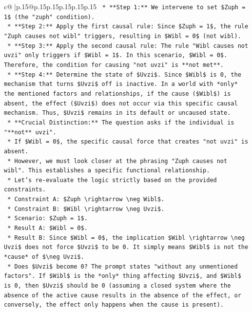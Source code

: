 \documentclass{article}
\begin{document}
{\begin{supertabular}{c@{$\;$}|p{.15\linewidth}@{}p{.15\linewidth}p{.15\linewidth}p{.15\linewidth}p{.15\linewidth}p{.15\linewidth}}
{{{\texttt{    *   **Step 1:** We intervene to set \$Zuph = 1\$ (the "zuph" condition).} \\
\texttt{    *   **Step 2:** Apply the first causal rule: Since \$Zuph = 1\$, the rule "Zuph causes not wibl" triggers, resulting in \$Wibl = 0\$ (not wibl).} \\
\texttt{    *   **Step 3:** Apply the second causal rule: The rule "Wibl causes not uvzi" only triggers if \$Wibl = 1\$. In this scenario, \$Wibl = 0\$. Therefore, the condition for causing "not uvzi" is **not met**.} \\
\texttt{    *   **Step 4:** Determine the state of \$Uvzi\$. Since \$Wibl\$ is 0, the mechanism that turns \$Uvzi\$ off is inactive. In a world with *only* the mentioned factors and relationships, if the cause (\$Wibl\$) is absent, the effect (\$Uvzi\$) does not occur via this specific causal mechanism. Thus, \$Uvzi\$ remains in its default or uncaused state.} \\
\texttt{    *   **Crucial Distinction:** The question asks if the individual is "**not** uvzi".} \\
\texttt{        *   If \$Wibl = 0\$, the specific causal force that creates "not uvzi" is absent.} \\
\texttt{        *   However, we must look closer at the phrasing "Zuph causes not wibl". This establishes a specific functional relationship.} \\
\texttt{        *   Let's re{-}evaluate the logic strictly based on the provided constraints.} \\
\texttt{        *   Constraint A: \$Zuph \textbackslash{}rightarrow \textbackslash{}neg Wibl\$.} \\
\texttt{        *   Constraint B: \$Wibl \textbackslash{}rightarrow \textbackslash{}neg Uvzi\$.} \\
\texttt{        *   Scenario: \$Zuph = 1\$.} \\
\texttt{        *   Result A: \$Wibl = 0\$.} \\
\texttt{        *   Result B: Since \$Wibl = 0\$, the implication \$Wibl \textbackslash{}rightarrow \textbackslash{}neg Uvzi\$ does not force \$Uvzi\$ to be 0. It simply means \$Wibl\$ is not the *cause* of \$\textbackslash{}neg Uvzi\$.} \\
\texttt{        *   Does \$Uvzi\$ become 0? The prompt states "without any unmentioned factors". If \$Wibl\$ is the *only* thing affecting \$Uvzi\$, and \$Wibl\$ is 0, then \$Uvzi\$ should be 0 (assuming a closed system where the absence of the active cause results in the absence of the effect, or conversely, the effect only happens when the cause is present).} \\
}}}
\end{supertabular}}
\end{document}
